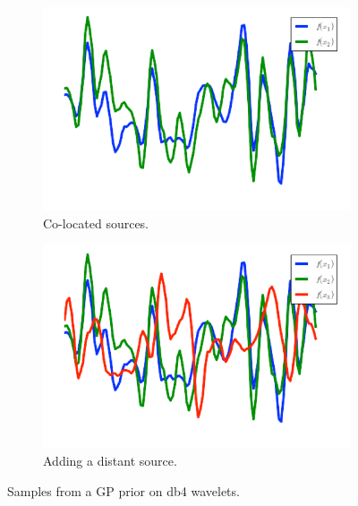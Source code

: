\documentclass[twoside]{article} \usepackage{aistats2017}
\begin{document}
\begin{figure}
\centering
\begin{subfigure}[b]{0.235\textwidth}
    \includegraphics[width=\textwidth]{wavelet_gps_same}
  \caption{Co-located sources.}
\end{subfigure}
\begin{subfigure}[b]{0.235\textwidth}
    \includegraphics[width=\textwidth]{wavelet_gps_different}
  \caption{Adding a distant source.}
\end{subfigure}
\caption{Samples from a GP prior on db4 wavelets.}
\label{fig:wavelet_gps}
\end{figure}
\end{document}
